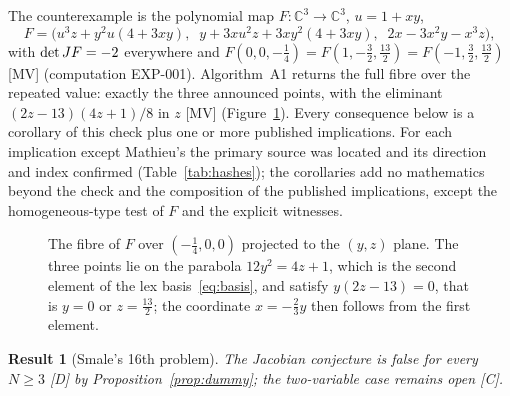 \documentclass[11pt]{article}
\newtheorem{corollary}{Result}
\theoremstyle{remark}
\newcommand{\C}{\mathbb{C}}
\newcommand{\EXP}[1]{\mbox{EXP-#1}}
\begin{document}
The counterexample is the polynomial map $F:\C^3\to\C^3$, $u=1+xy$,
\begin{equation}\label{eq:F}
F=\bigl(u^3z+y^2u(4+3xy),\;\;y+3xu^2z+3xy^2(4+3xy),\;\;2x-3x^2y-x^3z\bigr),
\end{equation}
with $\det JF=-2$ everywhere and $F(0,0,-\tfrac14)=F(1,-\tfrac32,\tfrac{13}2)=F(-1,\tfrac32,\tfrac{13}2)$ \cite{Alpoge2026} [MV] (computation \EXP{001}). Algorithm~A1 returns the full fibre over the repeated value: exactly the three announced points, with the eliminant $(2z-13)(4z+1)/8$ in $z$ [MV] (Figure~\ref{fig:fibre}). Every consequence below is a corollary of this check plus one or more published implications. For each implication except Mathieu's the primary source was located and its direction and index confirmed (Table~\ref{tab:hashes}); the corollaries add no mathematics beyond the check and the composition of the published implications, except the homogeneous-type test of $F$ and the explicit witnesses.

\begin{figure}[t]
\centering

\caption{The fibre of $F$ over $(-\tfrac14,0,0)$ projected to the $(y,z)$ plane. The three points lie on the parabola $12y^2=4z+1$, which is the second element of the lex basis~\eqref{eq:basis}, and satisfy $y(2z-13)=0$, that is $y=0$ or $z=\tfrac{13}2$; the coordinate $x=-\tfrac23y$ then follows from the first element.}
\label{fig:fibre}
\end{figure}

\begin{corollary}[Smale's 16th problem]
The Jacobian conjecture is false for every $N \ge 3$ [D] by Proposition~\ref{prop:dummy}; the two-variable case remains open [C].
\end{corollary}
\end{document}
